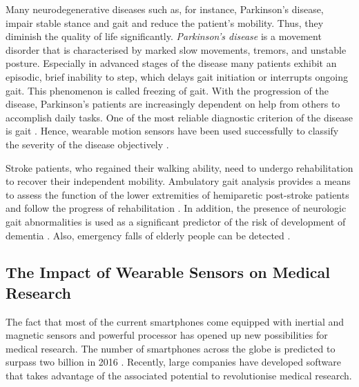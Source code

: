 Many neurodegenerative diseases such as, for instance, Parkinson's disease, impair stable stance and gait and reduce the patient's mobility. Thus, they diminish the quality of life significantly. \emph{Parkinson's disease} is a movement disorder that is characterised by marked slow movements, tremors, and unstable posture. Especially in advanced stages of the disease many patients exhibit an episodic, brief inability to step, which delays gait initiation or interrupts ongoing gait. This phenomenon is called freezing of gait. With the progression of the disease, Parkinson's patients are increasingly dependent on help from others to accomplish daily tasks. One of the most reliable diagnostic criterion of the disease is gait \cite{tao_gait_2012}. Hence, wearable motion sensors have been used successfully to classify the severity of the disease objectively \cite{mancini_anticipatory_2009, palmerini_feature_2011, klerk_long-term_2009}.

Stroke patients, who regained their walking ability, need to undergo rehabilitation to recover their independent mobility. Ambulatory gait analysis provides a means to assess the function of the lower extremities of hemiparetic post-stroke patients and follow the progress of rehabilitation \cite{tao_gait_2012, saremi_reliability_2006}. In addition, the presence of neurologic gait abnormalities is used as a significant predictor of the risk of development of dementia \cite{verghese_dementia_2002}. Also, emergency falls of elderly people can be detected \cite{bourke_threshold-based_2008, bourke_assessment-waist_2010, bourke_fall_detection_2008}.

\subsection{The Impact of Wearable Sensors on Medical Research}

The fact that most of the current smartphones come equipped with inertial and magnetic sensors and powerful processor has opened up new possibilities for medical research. The number of smartphones across the globe is predicted to surpass two billion in 2016 \cite{emarketer_smartphones}. Recently, large companies have developed software that takes advantage of the associated potential to revolutionise medical research.

